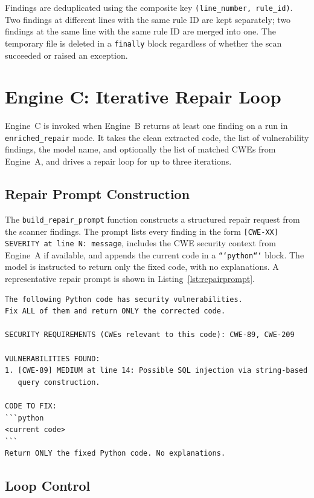 \documentclass[12pt,a4paper]{report}
\begin{document}
Findings are deduplicated using the composite key \texttt{(line\_number,
rule\_id)}. Two findings at different lines with the same rule ID are kept
separately; two findings at the same line with the same rule ID are merged into
one. The temporary file is deleted in a \texttt{finally} block regardless of
whether the scan succeeded or raised an exception.

\section{Engine C: Iterative Repair Loop}
\label{sec:enginec}

Engine~C is invoked when Engine~B returns at least one finding on a run
in \texttt{enriched\_repair} mode. It takes the clean extracted code, the list
of vulnerability findings, the model name, and optionally the list of matched
CWEs from Engine~A, and drives a repair loop for up to three iterations.

\subsection{Repair Prompt Construction}
\label{ssec:repairprompt}

The \texttt{build\_repair\_prompt} function constructs a structured repair
request from the scanner findings. The prompt lists every finding in the form
\texttt{[CWE-XX] SEVERITY at line N: message}, includes the CWE security
context from Engine~A if available, and appends the current code in a
\texttt{```python```} block. The model is instructed to return only the fixed
code, with no explanations. A representative repair prompt is shown in
Listing~\ref{lst:repairprompt}.

\begin{lstlisting}[caption={Structure of Engine~C repair prompt},
                   label={lst:repairprompt}, language={}]
The following Python code has security vulnerabilities.
Fix ALL of them and return ONLY the corrected code.

SECURITY REQUIREMENTS (CWEs relevant to this code): CWE-89, CWE-209

VULNERABILITIES FOUND:
1. [CWE-89] MEDIUM at line 14: Possible SQL injection via string-based
   query construction.

CODE TO FIX:
```python
<current code>
```
Return ONLY the fixed Python code. No explanations.
\end{lstlisting}

\subsection{Loop Control}
\label{ssec:loopcontrol}
\end{document}
